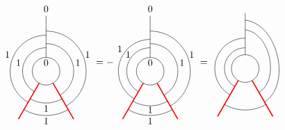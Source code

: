 	\begin{equation*}
		\begin{tikzpicture}[scale=1,baseline=(current bounding box.center)]
			\draw (0,0) circle (0.5cm);
			\draw[red,line width=0.4mm]
			\foreach \a in {-60, -120} {
				(\a:0.5) -- (\a:2)
			};
			\draw[] (90:0.5) -- (90:2);
			\draw ([shift=(-60:1cm)]0,0) arc (-60:90:1cm);
			\draw ([shift=(-120:1.15cm)]0,0) arc (-120:-60:1.15cm);
			\draw ([shift=(240:0.85cm)]0,0) arc (240:90:0.85cm);
			\draw ([shift=(240:1.3cm)]0,0) arc (240:90:1.3cm);
			\draw ([shift=(-60:1.45cm)]0,0) arc (-60:90:1.45cm);
			\draw ([shift=(-120:1.6cm)]0,0) arc (-120:-60:1.6cm);
			\node at (90:.3cm){$0$};\node at (90:2.25cm){$0$};
			\node at (-1,0.3) {$1$};
			\node at (1.15,0.3) {$1$};
			\node at (0,-1.35) {$1$};
			\node at (-1.4,0.6) {$1$};
			\node at (1.5,0.6) {$1$};
			\node at (0,-1.8) {$1$};
		\end{tikzpicture}
		=-\begin{tikzpicture}[scale=1,baseline=(current bounding box.center)]
			\draw (0,0) circle (0.5cm);
			\draw[red,line width=0.4mm]
			\foreach \a in {-60, -120} {
				(\a:0.5) -- (\a:2)
			};
			\draw[] (90:0.5) -- (90:2);
			\draw ([shift=(-60:1cm)]0,0) arc (-60:90:1cm);
			\draw ([shift=(-120:1.25cm)]0,0) arc (-120:-60:1.25cm);
			\draw ([shift=(240:0.85cm)]0,0) arc (240:90:0.85cm);
			\draw ([shift=(240:1.15cm)]0,0) arc (240:90:1.15cm);
			\draw ([shift=(-60:1.45cm)]0,0) arc (-60:90:1.45cm);
			\draw ([shift=(-120:1.6cm)]0,0) arc (-120:-60:1.6cm);
			\node at (90:.3cm){$0$};\node at (90:2.25cm){$0$};
			\node at (-1.1,0.8) {$1$};
			\node at (1.15,0.3) {$1$};
			\node at (0,-1.4) {$1$};
			\node at (-0.8,0.6) {$1$};
			\node at (1.5,0.6) {$1$};
			\node at (0,-1.8) {$1$};
		\end{tikzpicture}
		=\begin{tikzpicture}[scale=1,baseline=(current bounding box.center)]
			\draw (0,0) circle (0.5cm);
			\draw[red,line width=0.4mm]
			\foreach \a in {-60, -120} {
				(\a:0.5) -- (\a:2)
			};
			\draw[] (90:0.5) -- (90:2);
			\draw ([shift=(240:0.75cm)]0,0) arc (240:90:0.75cm);
			\draw ([shift=(-60:1cm)]0,0) to [bend right=70] ([shift=(90:1.4cm)]0,0);
			\draw ([shift=(-120:1.5cm)]0,0) arc (-120:-60:1.5cm);
			\draw ([shift=(240:1.1cm)]0,0) arc (240:90:1.1cm);
			\draw ([shift=(-60:1.4cm)]0,0) to [bend right=70] ([shift=(90:1.75cm)]0,0);

\end{tikzpicture}
\end{equation*}
